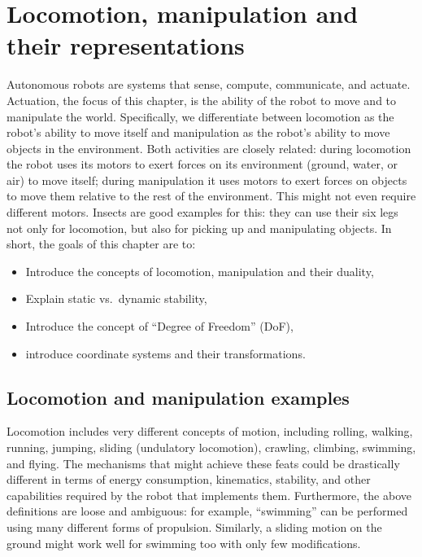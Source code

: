 \chapter{Locomotion, manipulation and their representations}\label{chap:locomotion}

Autonomous robots are systems that sense, compute, communicate, and actuate. Actuation, the focus of this chapter, is the ability of the robot to move and to manipulate the world. Specifically, we differentiate between locomotion as the robot's ability to move itself and manipulation as the robot's ability to move objects in the environment. Both activities are closely related: during locomotion the robot uses its motors to exert forces on its environment (ground, water, or air) to move itself; during manipulation it uses motors to exert forces on objects to move them relative to the rest of the environment. This might not even require different motors. Insects are good examples for this: they can use their six legs not only for locomotion, but also for picking up and manipulating objects. In short, the goals of this chapter are to:
\begin{itemize}
\item Introduce the concepts of locomotion, manipulation and their duality,
\item Explain static vs.\ dynamic stability,
\item Introduce the concept of ``Degree of Freedom'' (DoF),
\item introduce coordinate systems and their transformations.
\end{itemize}

\section{Locomotion and manipulation examples}

Locomotion includes very different concepts of motion, including rolling, walking, running, jumping, sliding (undulatory locomotion), crawling, climbing, swimming, and flying. The mechanisms that might achieve these feats could be drastically different in terms of energy consumption, kinematics, stability, and other capabilities required by the robot that implements them. Furthermore, the above definitions are loose and ambiguous: for example, ``swimming'' can be performed using many different forms of propulsion. Similarly, a sliding motion on the ground might work well for swimming too with only few modifications.

